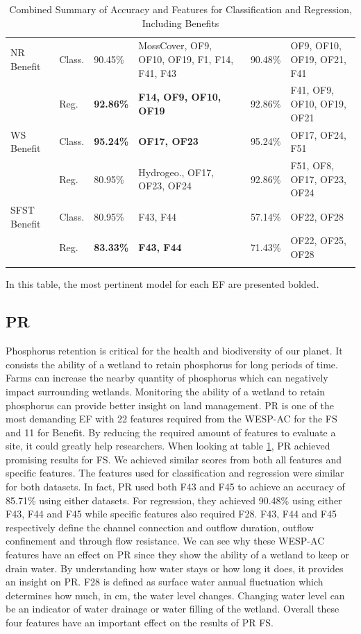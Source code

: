 \documentclass[12pt,letterpaper]{article}
\begin{document}
\begin{longtable}{|p{2cm}|p{1.5cm}|p{1.5cm}|p{3.5cm}|p{1.5cm}|p{3.5cm}|}
\hline
NR Benefit & Class. & 90.45\% & MossCover, OF9, OF10, OF19, F1, F14, F41, F43 & 90.48\% & OF9, OF10, OF19, OF21, F41 \\
\cline{2-6}
 & Reg. & \textbf{92.86\%} & \textbf{F14, OF9, OF10, OF19} & 92.86\% & F41, OF9, OF10, OF19, OF21 \\
\hline
WS Benefit & Class. & \textbf{95.24\%} & \textbf{OF17, OF23} & 95.24\% & OF17, OF24, F51 \\
\cline{2-6}
 & Reg. & 80.95\% & Hydrogeo., OF17, OF23, OF24 & 92.86\% & F51, OF8, OF17, OF23, OF24 \\
\hline
SFST Benefit & Class. & 80.95\% &  F43, F44 & 57.14\% & OF22, OF28 \\
\cline{2-6}
 & Reg. & \textbf{83.33\%} & \textbf{F43, F44 }& 71.43\% & OF22, OF25, OF28 \\
\hline
\caption{Combined Summary of Accuracy and Features for Classification and Regression, Including Benefits}
\label{tab:combined_summary}
\end{longtable}
In this table, the most pertinent model for each \ac{EF} are presented bolded.

\subsection{PR}
Phosphorus retention is critical for the health and biodiversity of our planet.
It consists the ability of a wetland to retain phosphorus for long periods of time.
Farms can increase the nearby quantity of phosphorus which can negatively impact surrounding wetlands.
Monitoring the ability of a wetland to retain phosphorus can provide better insight on land management.
PR is one of the most demanding \ac{EF} with 22 features required from the WESP-AC for the \ac{FS} and 11 for Benefit.
By reducing the required amount of features to evaluate a site, it could greatly help researchers.
When looking at table \ref{tab:combined_summary}, \ac{PR} achieved promising results for \ac{FS}.
We achieved similar scores from both all features and specific features.
The features used for classification and regression were similar for both datasets.
In fact, \ac{PR} used both F43 and F45 to achieve an accuracy of 85.71\% using either datasets.
For regression, they achieved 90.48\% using either F43, F44 and F45 while specific features also required F28.
F43, F44 and F45 respectively define the channel connection and outflow duration, outflow confinement and through flow resistance.
We can see why these WESP-AC features have an effect on \ac{PR} since they show the ability of a wetland to keep or drain water.
By understanding how water stays or how long it does, it provides an insight on \ac{PR}.
F28 is defined as surface water annual fluctuation which determines how much, in cm, the water level changes.
Changing water level can be an indicator of water drainage or water filling of the wetland.
Overall these four features have an important effect on the results of \ac{PR} \ac{FS}.
\end{document}
